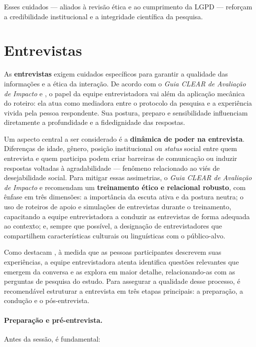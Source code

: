 \documentclass[12pt, a4paper, openany]{book}
\begin{document}
Esses cuidados --- aliados \`a revis\~ao \'etica e ao cumprimento da LGPD --- refor\c{c}am a credibilidade institucional e a integridade cient\'ifica da pesquisa.

\section{Entrevistas}

As \textbf{entrevistas} exigem cuidados espec\'ificos para garantir a qualidade das informa\c{c}\~oes e a \'etica da intera\c{c}\~ao. De acordo com o \textit{Guia CLEAR de Avalia\c{c}\~ao de Impacto} \citep{fgvclear2025ai} e \citet{creswell2014research}, o papel da equipe entrevistadora vai al\'em da aplica\c{c}\~ao mec\^anica do roteiro: ela atua como mediadora entre o protocolo da pesquisa e a experi\^encia vivida pela pessoa respondente. Sua postura, preparo e sensibilidade influenciam diretamente a profundidade e a fidedignidade das respostas.

Um aspecto central a ser considerado \'e a \textbf{din\^amica de poder na entrevista}. Diferen\c{c}as de idade, g\^enero, posi\c{c}\~ao institucional ou \textit{status} social entre quem entrevista e quem participa podem criar barreiras de comunica\c{c}\~ao ou induzir respostas voltadas \`a agradabilidade --- fen\^omeno relacionado ao vi\'es de desejabilidade social. Para mitigar essas assimetrias, o \textit{Guia CLEAR de Avalia\c{c}\~ao de Impacto} \citep{fgvclear2025ai} e \citet{creswell2014research} recomendam um \textbf{treinamento \'etico e relacional robusto}, com \^enfase em tr\^es dimens\~oes: a import\^ancia da escuta ativa e da postura neutra; o uso de roteiros de apoio e simula\c{c}\~oes de entrevistas durante o treinamento, capacitando a equipe entrevistadora a conduzir as entrevistas de forma adequada ao contexto; e, sempre que poss\'ivel, a designa\c{c}\~ao de entrevistadores que compartilhem caracter\'isticas culturais ou lingu\'isticas com o p\'ublico-alvo.

Como destacam \citet{eppich2019in}, \`a medida que as pessoas participantes descrevem suas experi\^encias, a equipe entrevistadora atenta identifica quest\~oes relevantes que emergem da conversa e as explora em maior detalhe, relacionando-as com as perguntas de pesquisa do estudo. Para assegurar a qualidade desse processo, \'e recomend\'avel estruturar a entrevista em tr\^es etapas principais: a prepara\c{c}\~ao, a condu\c{c}\~ao e o p\'os-entrevista.

\paragraph{Prepara\c{c}\~ao e pr\'e-entrevista.} Antes da sess\~ao, \'e fundamental:
\end{document}
